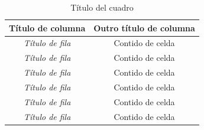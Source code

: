 

\begin{table}[hp!]
  \centering
  \begin{tabular}{c|c}
  \rowcolor{udcpink!25}
  \textbf{Título de columna} & \textbf{Outro título de columna} \\\hline
  \textit{Título de fila} & Contido de celda \\
  \textit{Título de fila} & Contido de celda \\
  \textit{Título de fila} & Contido de celda \\
  \textit{Título de fila} & Contido de celda \\
  \textit{Título de fila} & Contido de celda \\
  \textit{Título de fila} & Contido de celda \\
  \end{tabular}
  \caption{Título del cuadro}
  \label{tab:exemplo}
\end{table}



